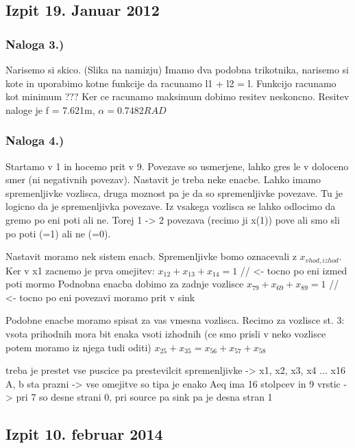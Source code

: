 \documentclass[a4paper,11pt]{article}
\begin{document}
\subsection{Izpit 19. Januar 2012}

\subsubsection{Naloga 3.)}

Narisemo si skico. (Slika na namizju)
Imamo dva podobna trikotnika, narisemo si kote in uporabimo kotne funkcije da racunamo l1 + l2 = l. Funkcijo racunamo kot minimum ??? Ker ce racunamo maksimum dobimo resitev neskoncno.
Resitev naloge je f = 7.621m, $\alpha = 0.7482 RAD$



\subsubsection{Naloga 4.)}

Startamo v 1 in hocemo prit v 9. Povezave so usmerjene, lahko gres le v doloceno smer (ni negativnih povezav). Nastavit je treba neke enacbe. Lahko imamo spremenljivke vozlisca, druga moznost pa je da so spremenljivke povezave. Tu je logicno da je spremenljivka povezave. Iz vsakega vozlisca se lahko odlocimo da gremo po eni poti ali ne. Torej 1 -> 2 povezava (recimo ji x(1)) pove ali smo sli po poti (=1) ali ne (=0).

Nastavit moramo nek sistem enacb. Spremenljivke bomo oznacevali z $x_{vhod, izhod}$.
Ker v x1 zacnemo je prva omejitev:
$x_12 + x_13 + x_14 = 1$ // <- tocno po eni izmed poti mormo
Podnobna enacba dobimo za zadnje vozlisce
$x_79 + x_69 + x_89 = 1$ // <- tocno po eni povezavi moramo prit v sink

Podobne enacbe moramo spisat za vas vmesna vozlisca.
Recimo za vozlisce st. 3:
vsota prihodnih mora bit enaka vsoti izhodnih (ce smo prisli v neko vozlisce potem moramo iz njega tudi oditi)
$x_25 + x_35 = x_56 + x_57 + x_{58}$

treba je prestet vse puscice pa prestevilcit spremenljivke -> x1, x2, x3, x4 ... x16
A, b sta prazni -> vse omejitve so tipa je enako
Aeq ima 16 stolpcev in 9 vrstic -> pri 7 so desne strani 0, pri source pa sink pa je desna stran 1


\subsection{Izpit 10. februar 2014}
\end{document}
